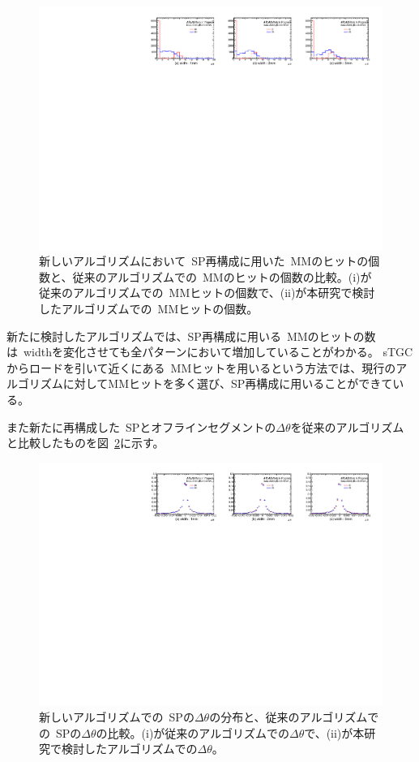 \begin{figure}[H]
    \centering
    \includegraphics[clip, width=14cm]{fig/5/numOfMMHit_multiWidth.pdf}
    \caption{新しいアルゴリズムにおいて~SP再構成に用いた~MMのヒットの個数と、従来のアルゴリズムでの~MMのヒットの個数の比較。(i)が従来のアルゴリズムでの~MMヒットの個数で、(ii)が本研究で検討したアルゴリズムでの~MMヒットの個数。}
    \label{fig:numOfHitMultiWidth}
\end{figure}

新たに検討したアルゴリズムでは、SP再構成に用いる~MMのヒットの数は~widthを変化させても全パターンにおいて増加していることがわかる。
sTGCからロードを引いて近くにある~MMヒットを用いるという方法では、現行のアルゴリズムに対してMMヒットを多く選び、SP再構成に用いることができている。

また新たに再構成した~SPとオフラインセグメントの$\Delta \theta$を従来のアルゴリズムと比較したものを図~\ref{fig:deltaThetaMultiWidth}に示す。

\begin{figure}[H]
    \centering
    \includegraphics[clip, width=14cm]{fig/5/deltaTheta_multiWidth.pdf}
    \caption{新しいアルゴリズムでの~SPの$\Delta \theta$の分布と、従来のアルゴリズムでの~SPの$\Delta \theta$の比較。(i)が従来のアルゴリズムでの$\Delta \theta$で、(ii)が本研究で検討したアルゴリズムでの$\Delta \theta$。}
    \label{fig:deltaThetaMultiWidth}
\end{figure}

